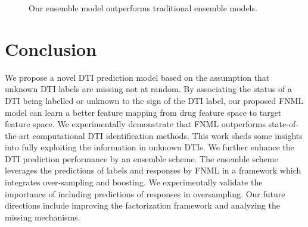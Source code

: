 \documentclass[journal]{IEEEtran}
\begin{document}
\begin{figure}[t]
\centering
{}
\caption{Our ensemble model outperforms traditional ensemble models.}\label{fig:ensemblecompare}
\end{figure}
\section{Conclusion}\label{sec:conclusion}

We propose a novel DTI prediction model based on the assumption that unknown DTI labels are missing not at random. By associating the status of a DTI being labelled or unknown to the sign of the DTI label, our proposed FNML model can learn a better feature mapping from drug feature space to target feature space. We experimentally demonstrate that FNML outperforms state-of-the-art computational DTI identification methods. This work sheds some insights into fully exploiting the information in unknown DTIs. We further enhance the DTI prediction performance by an ensemble scheme. The ensemble scheme leverages the predictions of labels and responses by FNML in a framework which integrates over-sampling and boosting. We experimentally validate the importance of including predictions of responses in oversampling. Our future directions include improving the factorization framework and analyzing the missing mechanisms. 
\end{document}
